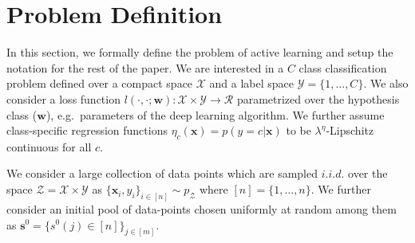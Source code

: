 \documentclass{article}
\begin{document}
\section{Problem Definition}
In this section, we formally define the problem of active learning and setup the notation for the rest of the paper. We are interested in a $C$ class classification problem defined over a compact space $\mathcal{X}$ and a label space  $\mathcal{Y}=\{1,\ldots,C\}$. We also consider a loss function $l(\cdot,\cdot;\mathbf{w}):\mathcal{X}\times \mathcal{Y} \rightarrow \mathcal{R}$ parametrized over the hypothesis class ($\mathbf{w}$), e.g.\ parameters of the deep learning algorithm. We further assume class-specific regression functions $\eta_c(\mathbf{x})=p(y=c|\mathbf{x})$ to be \mbox{$\lambda^\eta$-Lipschitz} continuous for all $c$.

We consider a large collection of data points which are sampled $i.i.d.$ over the space  $\mathcal{Z}=\mathcal{X}\times\mathcal{Y}$ as \mbox{$\{\mathbf{x}_i,y_i\}_{i \in [n]} \sim p_\mathcal{Z}$} where $[n]=\{1,\ldots,n\}$. We further consider an initial pool of data-points chosen uniformly at random among them as \mbox{$\mathbf{s}^0=\{s^0(j) \in [n]\}_{j \in [m]}$}.
\end{document}
